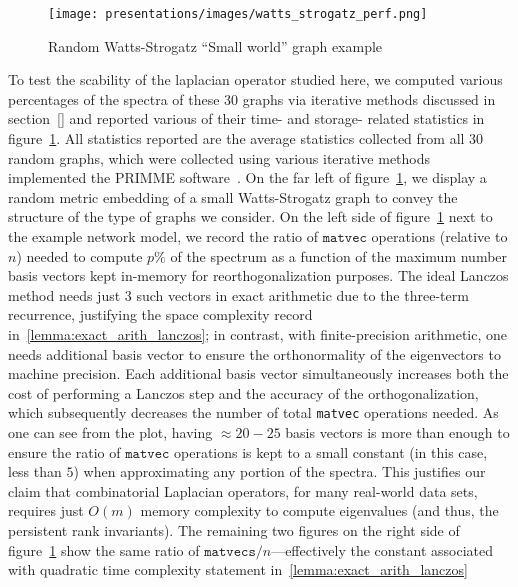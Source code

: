 \documentclass[10pt]{article}
\numberwithin{equation}{section}
\newcommand{\+}{%
	\raisebox{0.18ex}{\scaleobj{0.55}{+}}
}
\theoremstyle{definition}
\theoremstyle{definition}
\begin{document}
\begin{figure}[t]
	\texttt{[image: presentations/images/watts\_strogatz\_perf.png]}
	\caption{Random Watts-Strogatz ``Small world'' graph example}
	\label{fig:watts_strogatz}
\end{figure}
To test the scability of the laplacian operator studied here, we computed various percentages of the spectra of these $30$ graphs via iterative methods discussed in section~\ref{} and reported various of their time- and storage- related statistics in figure~\ref{fig:watts_strogatz}. 
All statistics reported are the average statistics collected from all 30 random graphs, which were collected using  various iterative methods implemented the PRIMME software~\cite{}. 
On the far left of figure~\ref{fig:watts_strogatz}, we display a random metric embedding of a small Watts-Strogatz graph to convey the structure of the type of graphs we consider. 
On the left side of figure~\ref{fig:watts_strogatz} next to the example network model, we record the ratio of $\mathtt{matvec}$ operations (relative to $n$) needed to compute $p\%$ of the spectrum as a function of the maximum number basis vectors kept in-memory for reorthogonalization purposes. 
The ideal Lanczos method needs just $3$ such vectors in exact arithmetic due to the three-term recurrence, justifying the space complexity record in~\ref{lemma:exact_arith_lanczos}; in contrast, with finite-precision arithmetic, one needs additional basis vector to ensure the orthonormality of the eigenvectors to machine precision.
Each additional basis vector simultaneously increases both the cost of performing a Lanczos step and the accuracy of the orthogonalization, which subsequently decreases the number of total \texttt{matvec} operations needed. 
As one can see from the plot, having $\approx 20-25$ basis vectors is more than enough to ensure the ratio of $\mathtt{matvec}$ operations is kept to a small constant (in this case, less than $5$) when approximating any portion of the spectra. 
This justifies our claim that combinatorial Laplacian operators, for many real-world data sets, requires just $O(m)$ memory complexity to compute eigenvalues (and thus, the persistent rank invariants).
 The remaining two figures on the right side of figure~\ref{fig:watts_strogatz} show the same ratio of $\mathtt{matvecs}/n$---effectively the constant associated with quadratic time complexity statement in~\ref{lemma:exact_arith_lanczos}


\end{document}
